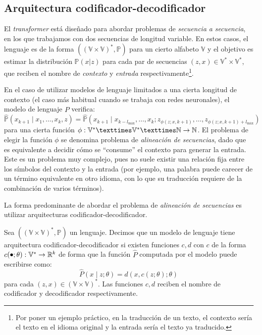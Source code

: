 \subsection{Arquitectura codificador-decodificador}
El \textit{transformer} está diseñado para abordar problemas de \textit{secuencia a secuencia}, en los que trabajamos con dos secuencias de longitud variable. En estos casos, el lenguaje es de la forma \( ((\mathbb{V} × \mathbb{V})^*, \mathbb{P}) \) para un cierto alfabeto \( \mathbb{V} \) y el objetivo es estimar la distribución \( \mathbb{P}(x | z) \) para cada par de secuencias \( (z, x) \in \mathbb{V}^* × \mathbb{V}^* \), que reciben el nombre de \textit{contexto} y \textit{entrada} respectivamente\footnote{Por poner un ejemplo práctico, en la traducción de un texto, el contexto sería el texto en el idioma original y la entrada sería el texto ya traducido.}. 

En el caso de utilizar modelos de lenguaje limitados a una cierta longitud de contexto (el caso más habitual cuando se trabaja con redes neuronales), el modelo de lenguaje \( \widehat{P} \) verifica:
\[
    \widehat{\mathbb{P}} \left( x_{k+1} \mid  x_1, …, x_k, z \right) = \widehat{\mathbb{P}} \left( x_{k+1} \mid x_{k - l_\text{máx}}, …, x_k; z_{\phi(z; x, k+1)}, …, z_{\phi(z; x, k+1) + l_\text{máx}} \right) 
\]
para una cierta función \( \phi : \mathbb{V}^* × \mathbb{V}^* × \nat \to \nat \). El problema de elegir la función \( \phi \) se denomina problema de \textit{alineación de secuencias}, dado que es equivalente a decidir cómo se ``consume'' el contexto para generar la entrada. Este es un problema muy complejo, pues no suele existir una relación fija entre los símbolos del contexto y la entrada (por ejemplo, una palabra puede carecer de un término equivalente en otro idioma, con lo que su traducción requiere de la combinación de varios términos).

La forma predominante de abordar el problema de \textit{alineación de secuencias} es utilizar arquitecturas codificador-decodificador. 

\begin{definition}
    Sea  \( ((\mathbb{V} × \mathbb{V})^*, \mathbb{P}) \) un lenguaje. Decimos que un modelo de lenguaje tiene arquitectura codificador-decodificador si existen funciones \( c, d \) con \( c \) de la forma \( c(\smallbullet; \theta) : \mathbb{V}^* \to \real{k} \) de forma que la función \( \widehat{P} \) computada por el modelo puede escribirse como:
    \begin{equation}\label{eq:encoder}
        \widehat{P}(x \mid z; \theta) = d(x, c(z; \theta); \theta) 
    \end{equation}
    para cada \( (z, x) \in (\mathbb{V} × \mathbb{V})^* \). Las funciones \( c, d \) reciben el nombre de codificador y decodificador respectivamente.
\end{definition}

